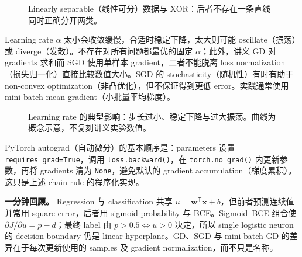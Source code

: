 \begin{figure}[htbp]
  \centering
  \resizebox{0.86\textwidth}{!}{}
  \caption{Linearly separable（线性可分）数据与 XOR：后者不存在一条直线同时正确分开两类。}
  \label{fig:sc4001-l02-linear-separability}
\end{figure}

Learning rate $\alpha$ 太小会收敛缓慢，合适时稳定下降，太大则可能 oscillate（振荡）或 diverge（发散）。不存在对所有问题都最优的固定 $\alpha$；此外，讲义 GD 对 gradients 求和而 SGD 使用单样本 gradient，二者不能脱离 loss normalization（损失归一化）直接比较数值大小。SGD 的 stochasticity（随机性）有时有助于 non-convex optimization（非凸优化），但不保证得到更低 error。实践通常使用 mini-batch mean gradient（小批量平均梯度）。

\begin{figure}[htbp]
  \centering
  \resizebox{0.84\textwidth}{!}{}
  \caption{Learning rate 的典型影响：步长过小、稳定下降与过大振荡。曲线为概念示意，不复刻讲义实验数值。}
  \label{fig:sc4001-l02-learning-rate}
\end{figure}

PyTorch autograd（自动微分）的基本顺序是：parameters 设置 \texttt{requires\_grad=True}，调用 \texttt{loss.backward()}，在 \texttt{torch.no\_grad()} 内更新参数，再将 gradients 清为 \texttt{None}，避免默认的 gradient accumulation（梯度累积）。这只是上述 chain rule 的程序化实现。

\textbf{一分钟回顾。}
Regression 与 classification 共享 $u=\bm w^{\mathsf T}\bm x+b$，但前者预测连续值并常用 square error，后者用 sigmoid probability 与 BCE。Sigmoid--BCE 组合使 $\partial J/\partial u=p-d$；最终 label 由 $p>0.5\iff u>0$ 决定，所以 single logistic neuron 的 decision boundary 仍是 linear hyperplane。GD、SGD 与 mini-batch GD 的差异在于每次更新使用的 samples 及 gradient normalization，而不只是名称。

